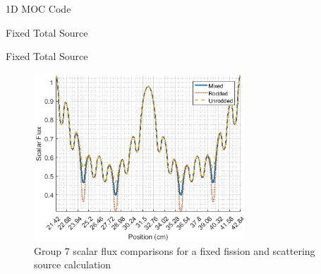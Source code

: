 \begin{frame}[t]{1D MOC Code}
    
    
    
\end{frame}


\begin{frame}[t]{Fixed Total Source}



\end{frame}


\begin{frame}[t]{Fixed Total Source}
    
    \begin{figure}[H]
      \centering
      \includegraphics[width=0.7\textwidth]{../figs/1dmoc-50mix-fixedscat-scalflux7.png}
      \caption{Group 7 scalar flux comparisons for a fixed fission and scattering source calculation}\label{f:1dmoc-fixed-50-scalflux7}
    \end{figure}
    
\end{frame}


